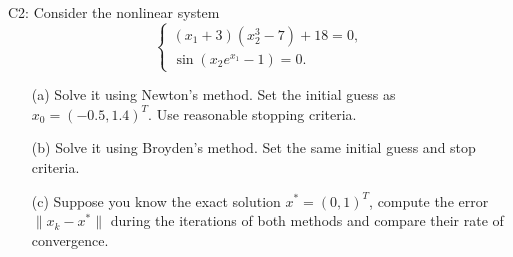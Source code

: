 \documentclass[12pt]{report}
\begin{document}
\newpage



\begin{problem}
    C2: Consider the nonlinear system
    \[ 
        \begin{cases}
            (x_1 + 3)(x_2^3 - 7) + 18 = 0,\\
            \sin(x_2e^{x_1} - 1) = 0.
        \end{cases}
    \]
    \begin{enumerate}
        \item [(a)] Solve it using Newton's method. Set the initial guess as $x_0 = (-0.5,1.4)^T$. Use reasonable stopping criteria. 
        \item [(b)] Solve it using Broyden's method. Set the same initial guess and stop criteria. 
        \item [(c)] Suppose you know the exact solution $x^* = (0,1)^T$, compute the error $\| x_k - x^*\|$ during the iterations of both methods and compare their rate of convergence. 
    \end{enumerate}
\end{problem}
\end{document}
